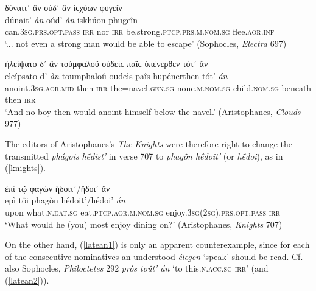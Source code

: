 \begin{exe}
\ex δύναιτ᾽ ἂν ούδ᾽ ἂν ἰϲχύων φυγεῖν\\
\gll dúnait' \emph{àn} oúd' \emph{àn} iskhúōn phugeîn\\
can.\textsc{3sg.prs.opt.pass} \textsc{irr} nor \textsc{irr} be.strong.\textsc{ptcp.prs.m.nom.sg} flee.\textsc{aor.inf}\\
\trans `... not even a strong man would be able to escape' (Sophocles, \textit{Electra} 697)
\label{multiplean2}
\end{exe}

\begin{exe}
\ex ἠλείψατο δ᾽ ἂν τοὐμφαλοῦ οὐδεὶϲ παῖϲ ὑπένερθεν τότ᾽ ἄν\\
\gll ēleípsato d' \emph{àn} toumphaloû oudeìs paîs hupénerthen tót' \emph{án}\\
anoint.\textsc{3sg.aor.mid} then \textsc{irr} the=navel.\textsc{gen.sg} none.\textsc{m.nom.sg} child.\textsc{nom.sg} beneath then \textsc{irr}\\
\trans `And no boy then would anoint himself below the navel.' (Aristophanes, \textit{Clouds} 977)
\label{multiplean3}
\end{exe}

The editors of Aristophanes's \emph{The Knights} were therefore right to change the transmitted \textit{phágois hḗdist'} in verse 707 to \textit{phagṑn hḗdoit'} (or \textit{hḗdoi}), as in (\ref{knights}).

\begin{exe}
\ex ἐπὶ τῷ φαγὼν ἥδοιτ᾽/ἥδοι᾽ ἄν\\
\gll epì tôi phagṑn hḗdoit'/hḗdoi' \emph{án}\\
upon what.\textsc{n.dat.sg} eat.\textsc{ptcp.aor.m.nom.sg} enjoy.\textsc{3sg(2sg).prs.opt.pass} \textsc{irr}\\
\trans `What would he (you) most enjoy dining on?' (Aristophanes, \textit{Knights} 707)
\label{knights}
\end{exe}

On the other hand, (\ref{latean1}) is only an apparent counterexample, since for each of the consecutive nominatives an understood \emph{élegen} `speak' should be read. Cf. also Sophocles, \textit{Philoctetes} 292 \textit{pròs toût' \emph{án}} `to this.\textsc{n.acc.sg} \textsc{irr}' (and (\ref{latean2})).

